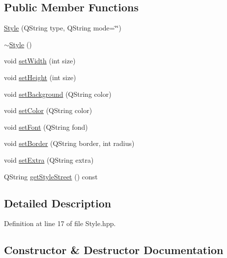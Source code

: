 \subsection*{Public Member Functions}
\begin{DoxyCompactItemize}
\item 
\mbox{\hyperlink{classbabel_1_1client_1_1_style_a8853abc3088e3c33d2f7572d14d95310}{Style}} (Q\+String type, Q\+String mode=\char`\"{}\char`\"{})
\item 
\mbox{\hyperlink{classbabel_1_1client_1_1_style_a4c776d2129e16188dc18a12c77e69338}{$\sim$\+Style}} ()
\item 
void \mbox{\hyperlink{classbabel_1_1client_1_1_style_a911d73615b56dcab495fb7a5d561fcf2}{set\+Width}} (int size)
\item 
void \mbox{\hyperlink{classbabel_1_1client_1_1_style_ad0c007eb7859af1107475418289f3360}{set\+Height}} (int size)
\item 
void \mbox{\hyperlink{classbabel_1_1client_1_1_style_a0e71aba88bb3e5b189c65f4c64d12b11}{set\+Background}} (Q\+String color)
\item 
void \mbox{\hyperlink{classbabel_1_1client_1_1_style_a773b09c82a2f634d48aa3050d23bdcc9}{set\+Color}} (Q\+String color)
\item 
void \mbox{\hyperlink{classbabel_1_1client_1_1_style_a92fc3392b44a618a45e916b81b2e2718}{set\+Font}} (Q\+String fond)
\item 
void \mbox{\hyperlink{classbabel_1_1client_1_1_style_ad7735aeb6a13a053a98c9a1bc0dad046}{set\+Border}} (Q\+String border, int radius)
\item 
void \mbox{\hyperlink{classbabel_1_1client_1_1_style_abe1b954b3e05ed7b548c30a0b5927ea4}{set\+Extra}} (Q\+String extra)
\item 
Q\+String \mbox{\hyperlink{classbabel_1_1client_1_1_style_a41d762c7a488f1f1359e70d90939a64a}{get\+Style\+Street}} () const
\end{DoxyCompactItemize}


\subsection{Detailed Description}


Definition at line 17 of file Style.\+hpp.



\subsection{Constructor \& Destructor Documentation}
\mbox{\label{classbabel_1_1client_1_1_style_a8853abc3088e3c33d2f7572d14d95310}} 
